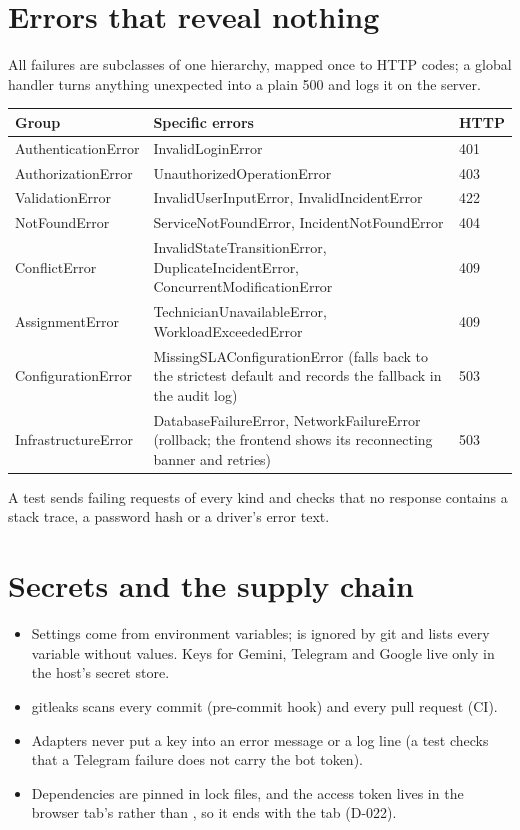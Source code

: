 \section{Errors that reveal nothing}
All failures are subclasses of one hierarchy, mapped once to HTTP codes; a global handler turns
anything unexpected into a plain 500 and logs it on the server.
\begin{center}
\begin{tabularx}{\textwidth}{@{}lXl@{}}
\toprule
\textbf{Group} & \textbf{Specific errors} & \textbf{HTTP} \\
\midrule
AuthenticationError & InvalidLoginError & 401 \\
AuthorizationError & UnauthorizedOperationError & 403 \\
ValidationError & InvalidUserInputError, InvalidIncidentError & 422 \\
NotFoundError & ServiceNotFoundError, IncidentNotFoundError & 404 \\
ConflictError & InvalidStateTransitionError, DuplicateIncidentError,
  ConcurrentModificationError & 409 \\
AssignmentError & TechnicianUnavailableError, WorkloadExceededError & 409 \\
ConfigurationError & MissingSLAConfigurationError (falls back to the strictest default and
  records the fallback in the audit log) & 503 \\
InfrastructureError & DatabaseFailureError, NetworkFailureError (rollback; the frontend shows
  its reconnecting banner and retries) & 503 \\
\bottomrule
\end{tabularx}
\end{center}
A test sends failing requests of every kind and checks that no response contains a stack trace,
a password hash or a driver's error text.

\section{Secrets and the supply chain}
\begin{itemize}
  \item Settings come from environment variables;  is ignored by git and
     lists every variable without values. Keys for Gemini, Telegram and
    Google live only in the host's secret store.
  \item gitleaks scans every commit (pre-commit hook) and every pull request (CI).
  \item Adapters never put a key into an error message or a log line (a test checks that a
    Telegram failure does not carry the bot token).
  \item Dependencies are pinned in lock files, and the access token lives in the browser
    tab's  rather than , so it ends with the tab (D-022).
\end{itemize}

